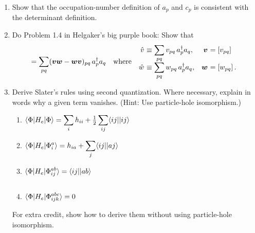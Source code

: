 \documentclass[11pt]{article}
\numberwithin{equation}{section}
\begin{document}
\begin{enumerate}
\item
  Show that the occupation-number definition of $a_p$ and $c_p$ is consistent with the determinant definition.

\item
  Do Problem 1.4 in Helgaker's big purple book:
  Show that
\begin{align*}
  [\op{v}, \op{w}]
=
  \sum_{pq}
  (\bm{v}\bm{w} - \bm{w}\bm{v})_{pq}\,
  a_p\dg a_q
&&
\text{where}\hspace{5pt}
\begin{array}{r@{\ }lr@{\ }l}
  \op{v}
&\equiv
\ds{
  \sum_{pq}
  v_{pq}\, a_p\dg a_q
}
,&
  \bm{v}
&=
  [v_{pq}]
\\
  \op{w}
&\equiv
\ds{
  \sum_{pq}
  w_{pq}\, a_p\dg a_q
}
,&
  \bm{w}
&=
  [w_{pq}]\,.
\end{array}
\end{align*}

\item
  Derive Slater's rules using second quantization.
  Where necessary, explain in words why a given term vanishes.
  (Hint: Use particle-hole isomorphism.)
  \begin{enumerate}
  \item
    ${\displaystyle
      \langle\Phi |H_e|\Phi \rangle
    =
      \sum_i
      h_{ii}
    +
      \tfrac{1}{2}
      \sum_{ij}
      \langle ij||ij\rangle
    }$
  \item
    ${\displaystyle
      \langle\Phi |H_e|\Phi _i^a\rangle
    =
      h_{ia}
    +
      \sum_j
      \langle ij||aj\rangle
    }$
  \item
    ${\displaystyle
      \langle\Phi |H_e|\Phi _{ij}^{ab}\rangle
    =
      \langle ij||ab\rangle
      \vphantom{\sum_j}
    }$
  \item
    ${\displaystyle
      \langle\Phi |H_e|\Phi _{ijk}^{abc}\rangle
    =
      0
    }$
  \end{enumerate}
  For extra credit, show how to derive them without using particle-hole isomorphism.
\end{enumerate}
\end{document}
